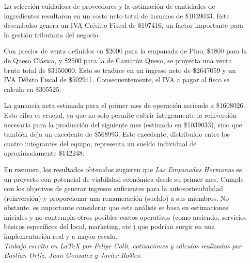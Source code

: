 \documentclass[12pt]{article}
\begin{document}
La selección cuidadosa de proveedores y la estimación de cantidades de ingredientes resultaron en un costo neto total de insumos de \$\num{1039033}. Este desembolso genera un IVA Crédito Fiscal de \$\num{197416}, un factor importante para la gestión tributaria del negocio.

Con precios de venta definidos en \$\num{2000} para la empanada de Pino, \$\num{1800} para la de Queso Clásica, y \$\num{2500} para la de Camarón Queso, se proyecta una venta bruta total de \$\num{3150000}. Esto se traduce en un ingreso neto de \$\num{2647059} y un IVA Débito Fiscal de \$\num{502941}. Consecuentemente, el IVA a pagar al fisco se calcula en \$\num{305525}.

La ganancia neta estimada para el primer mes de operación asciende a \$\num{1608026}. Esta cifra es crucial, ya que no solo permite cubrir íntegramente la reinversión necesaria para la producción del siguiente mes (estimada en \$\num{1039033}), sino que también deja un excedente de \$\num{568993}. Este excedente, distribuido entre los cuatro integrantes del equipo, representa un sueldo individual de aproximadamente \$\num{142248}.

En resumen, los resultados obtenidos sugieren que \textit{Las Empanadas Hermanas} es un proyecto con potencial de viabilidad económica desde su primer mes. Cumple con los objetivos de generar ingresos suficientes para la autosostenibilidad (reinversión) y proporcionar una remuneración (sueldo) a sus miembros. No obstante, es importante considerar que este análisis se basa en estimaciones iniciales y no contempla otros posibles costos operativos (como arriendo, servicios básicos específicos del local, marketing, etc.) que podrían surgir en una implementación real y a mayor escala. \\

\textit{Trabajo escrito en LaTeX por Felipe Colli, cotizaciones y cálculos realizados por Bastian Ortiz, Juan Gonzalez y Javier Robles.}
\end{document}
